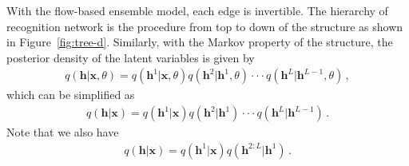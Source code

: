\documentclass{article} %
\begin{document}
With the flow-based ensemble model, each edge is invertible.   The hierarchy of recognition network is the procedure from top to down of the structure as shown in Figure~\ref{fig:tree-d}.  Similarly, with the Markov property of the structure, the posterior density of the latent 
variables is given by
\begin{align*}
q(\mathbf{h}| \mathbf{x}, \theta ) = q(\mathbf{h}^1 | \mathbf{x}, \theta)  q(\mathbf{h}^2 | \mathbf{h}^1, \theta) \cdot \cdot  \cdot  q(\mathbf{h}^{L} | \mathbf{h}^{L-1}, \theta) \, ,
\end{align*}
which can be simplified as 
\begin{align*}
q(\mathbf{h}| \mathbf{x}) = q(\mathbf{h}^1 | \mathbf{x})  q(\mathbf{h}^2 | \mathbf{h}^1) \cdot \cdot  \cdot  q(\mathbf{h}^{L} | \mathbf{h}^{L-1}) \, .
\end{align*}
Note that we also have 
\begin{align} \label{eq:chain}
q(\mathbf{h}| \mathbf{x}) = q(\mathbf{h}^1 | \mathbf{x})  q(\mathbf{h}^{2:L} | \mathbf{h}^1) \, .
\end{align}
\end{document}
